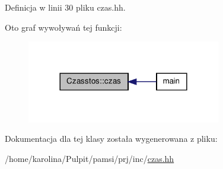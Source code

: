 Definicja w linii 30 pliku czas.\-hh.



Oto graf wywoływań tej funkcji\-:\nopagebreak
\begin{figure}[H]
\begin{center}
\leavevmode
\includegraphics[width=240pt]{class_czasstos_a49b08edabe35c166e4f8cddb4c9260c3_icgraph}
\end{center}
\end{figure}




Dokumentacja dla tej klasy została wygenerowana z pliku\-:\begin{DoxyCompactItemize}
\item 
/home/karolina/\-Pulpit/pamsi/prj/inc/\hyperlink{czas_8hh}{czas.\-hh}\end{DoxyCompactItemize}
